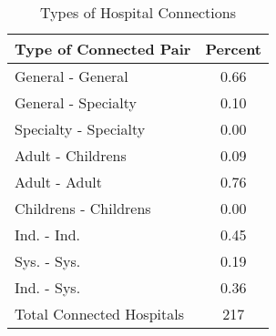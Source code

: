 \begin{table}[ht!]
\centering
\caption{Types of Hospital Connections\label{tab:hospital_pair_types}}
\centering
\begin{tabular}[t]{lc}
\toprule
Type of Connected Pair & Percent\\
\midrule
General - General & 0.66\\
General - Specialty & 0.10\\
Specialty - Specialty & 0.00\\
\addlinespace
Adult - Childrens & 0.09\\
Adult - Adult & 0.76\\
Childrens - Childrens & 0.00\\
\addlinespace
Ind. - Ind. & 0.45\\
Sys. - Sys. & 0.19\\
Ind. - Sys. & 0.36\\
\addlinespace
Total Connected Hospitals & 217\\
\bottomrule
\end{tabular}
\end{table}

